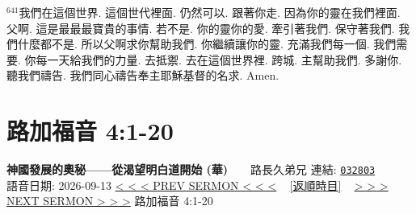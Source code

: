 \documentclass{book}
\begin{document}
$^{641}$我們在這個世界.
這個世代裡面.
仍然可以.
跟著你走.
因為你的靈在我們裡面.
父啊.
這是最最最寶貴的事情.
若不是.
你的靈你的愛.
牽引著我們.
保守著我們.
我們什麼都不是.
所以父啊求你幫助我們.
你繼續讓你的靈.
充滿我們每一個.
我們需要.
你每一天給我們的力量.
去抵禦.
去在這個世界裡.
跨城.
主幫助我們.
多謝你.
聽我們禱告.
我們同心禱告奉主耶穌基督的名求.
Amen.
\newpage



\section{路加福音 4:1-20}
\label{sec:032803}
\textbf{神國發展的奧秘——從渴望明白道開始 (華)}~~~~路長久弟兄
\newline
\newline
連結: \href{http://www.church.com.hk/acms/content.asp?site=cdc\&op=show\&type=product\&code=032803\&layout=sermon}{\texttt{032803}} ~~~~ 語音日期: 2026-09-13
\newline
\newline
\hyperref[sec:032802]{\small{< < < PREV SERMON < < <}}
~
\hyperref[sec:index_chronic]{\small{[返順時目]}}
~
\hyperref[sec:032804]{\small{> > > NEXT SERMON > > >}}
\newline
\newline
路加福音 4:1-20
\newline
\end{document}
